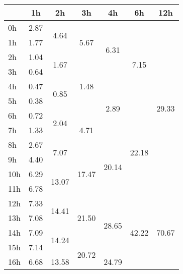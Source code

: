 \begin{center}
\begin{tabular}{| l || c | c | c | c | c | c |}\hline
 & 1h & 2h & 3h & 4h & 6h & 12h \\\hline
0h & \multirow{1}{*}{ 2.87 }  & \multirow{2}{*}{ 4.64 }  & \multirow{3}{*}{ 5.67 }  & \multirow{4}{*}{ 6.31 }  & \multirow{6}{*}{ 7.15 }  & \multirow{12}{*}{ 29.33 }  \\\cline{2-2}
1h & \multirow{1}{*}{ 1.77 }  & & & & & \\\cline{2-2}\cline{3-3}
2h & \multirow{1}{*}{ 1.04 }  & \multirow{2}{*}{ 1.67 }  & & & & \\\cline{2-2}\cline{4-4}
3h & \multirow{1}{*}{ 0.64 }  & & \multirow{3}{*}{ 1.48 }  & & & \\\cline{2-2}\cline{3-3}\cline{5-5}
4h & \multirow{1}{*}{ 0.47 }  & \multirow{2}{*}{ 0.85 }  & & \multirow{4}{*}{ 2.89 }  & & \\\cline{2-2}
5h & \multirow{1}{*}{ 0.38 }  & & & & & \\\cline{2-2}\cline{3-3}\cline{4-4}\cline{6-6}
6h & \multirow{1}{*}{ 0.72 }  & \multirow{2}{*}{ 2.04 }  & \multirow{3}{*}{ 4.71 }  & & \multirow{6}{*}{ 22.18 }  & \\\cline{2-2}
7h & \multirow{1}{*}{ 1.33 }  & & & & & \\\cline{2-2}\cline{3-3}\cline{5-5}
8h & \multirow{1}{*}{ 2.67 }  & \multirow{2}{*}{ 7.07 }  & & \multirow{4}{*}{ 20.14 }  & & \\\cline{2-2}\cline{4-4}
9h & \multirow{1}{*}{ 4.40 }  & & \multirow{3}{*}{ 17.47 }  & & & \\\cline{2-2}\cline{3-3}
10h & \multirow{1}{*}{ 6.29 }  & \multirow{2}{*}{ 13.07 }  & & & & \\\cline{2-2}
11h & \multirow{1}{*}{ 6.78 }  & & & & & \\\cline{2-2}\cline{3-3}\cline{4-4}\cline{5-5}\cline{6-6}\cline{7-7}
12h & \multirow{1}{*}{ 7.33 }  & \multirow{2}{*}{ 14.41 }  & \multirow{3}{*}{ 21.50 }  & \multirow{4}{*}{ 28.65 }  & \multirow{6}{*}{ 42.22 }  & \multirow{12}{*}{ 70.67 }  \\\cline{2-2}
13h & \multirow{1}{*}{ 7.08 }  & & & & & \\\cline{2-2}\cline{3-3}
14h & \multirow{1}{*}{ 7.09 }  & \multirow{2}{*}{ 14.24 }  & & & & \\\cline{2-2}\cline{4-4}
15h & \multirow{1}{*}{ 7.14 }  & & \multirow{3}{*}{ 20.72 }  & & & \\\cline{2-2}\cline{3-3}\cline{5-5}
16h & \multirow{1}{*}{ 6.68 }  & \multirow{2}{*}{ 13.58 }  & & \multirow{4}{*}{ 24.79 }  & & \\\cline{2-2}

\end{tabular}
\end{center}
